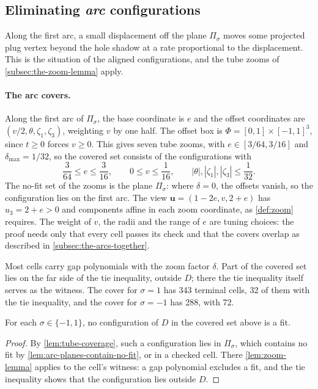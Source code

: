 \subsection{Eliminating \emph{arc} configurations}\label{subsec:eliminating-arc-configurations}

Along the first arc, a small displacement off the plane $\Pi_\sigma$ moves
some projected plug vertex beyond the hole shadow at a rate proportional to
the displacement. This is the situation of the aligned configurations, and
the tube zooms of \cref{subsec:the-zoom-lemma} apply.

\paragraph{The arc covers.}
Along the first arc of $\Pi_\sigma$, the base coordinate is $e$ and the
offset coordinates are $(v/2,\theta,\zeta_1,\zeta_3)$, weighting $v$ by one
half. The offset box is $\Phi=[0,1]\times{[-1,1]}^3$, since $t\ge0$ forces
$v\ge0$. This gives seven tube zooms, with $e\in[3/64,3/16]$ and
$\delta_{\max}=1/32$, so the covered set consists of the configurations with
\[
  \frac3{64}\le e\le\frac3{16},\qquad 0\le v\le\frac1{16},\qquad
  |\theta|,|\zeta_1|,|\zeta_3|\le\frac1{32}.
\]
The no-fit set of the zooms is the plane $\Pi_\sigma$: where $\delta=0$, the
offsets vanish, so the configuration lies on the first arc. The view
$\mathbf u=(1-2e,v,2+e)$ has $u_3=2+e>0$ and components affine in each zoom
coordinate, as \cref{def:zoom} requires. The weight of $v$, the radii and
the range of $e$ are tuning choices: the proof needs only that every cell
passes its check and that the covers overlap as described in
\cref{subsec:the-arcs-together}.

Most cells carry gap polynomials with the zoom factor $\delta$. Part of the
covered set lies on the far side of the tie inequality, outside $D$; there
the tie inequality itself serves as the witness. The cover for $\sigma=1$
has 343 terminal cells, 32 of them with the tie inequality, and the cover
for $\sigma=-1$ has 288, with 72.

\begin{proposition}\label{prop:arc-neighbourhoods}
  For each $\sigma\in\{-1,1\}$, no configuration of $D$ in the covered set
  above is a fit.
\end{proposition}
\begin{proof}
  By \cref{lem:tube-coverage}, such a configuration lies in
  $\Pi_\sigma$, which contains no fit by
  \cref{lem:arc-planes-contain-no-fit}, or in a checked cell. There
  \cref{lem:zoom-lemma} applies to the cell's witness: a gap polynomial
  excludes a fit, and the tie inequality shows that the configuration lies
  outside $D$.
\end{proof}

